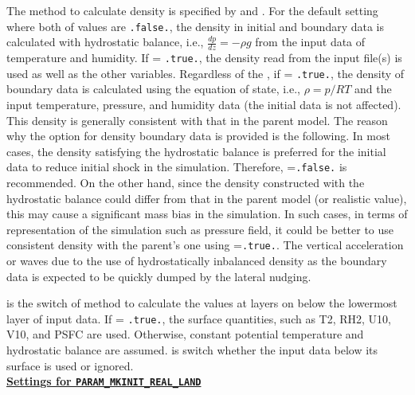 The method to calculate density is specified by  and .
For the default setting where both of values are \verb|.false.|, the density in initial and boundary data is calculated with hydrostatic balance, i.e., $\frac{dp}{dz}=-\rho g$ from the input data of temperature and humidity.
If  = \verb|.true.|, the density read from the input file(s) is used as well as the other variables.
Regardless of the , if  = \verb|.true.|,
the density of boundary data is calculated using the equation of state, i.e., $\rho = p/RT$ and the input temperature, pressure, and humidity data (the initial data is not affected).
This density is generally consistent with that in the parent model.
The reason why the option for density boundary data is provided is the following.
In most cases, the density satisfying the hydrostatic balance is preferred for the initial data to reduce initial shock in the simulation.
Therefore, =\verb|.false.| is recommended.
On the other hand, since the density constructed with the hydrostatic balance could differ from that in the parent model (or realistic value), this may cause a significant mass bias in the simulation.
In such cases, in terms of representation of the simulation such as pressure field, it could be better to use consistent density with the parent's one using =\verb|.true.|.
The vertical acceleration or waves due to the use of hydrostatically inbalanced density as the boundary data is expected to be quickly dumped by the lateral nudging.


 is the switch of method to calculate the values at layers on \scale below the lowermost layer of input data.
If  = \verb|.true.|, the surface quantities, such as T2, RH2, U10, V10, and PSFC are used.
Otherwise, constant potential temperature and hydrostatic balance are assumed.
 is switch whether the input data below its surface is used or ignored.
\\

\noindent\textbf{\underline{Settings for \texttt{PARAM\_MKINIT\_REAL\_LAND}}}

